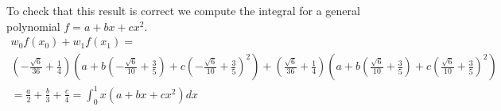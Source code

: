 \begin{solution}
  \newpage
  To check that this result is correct we compute the integral for a
  general polynomial $f = a + bx + cx^2$.
  \begin{align*}
    w_0 f(x_0) + w_1 f(x_1)  = \\
    \left(- \frac{\sqrt{6}}{36} + \frac{1}{4}\right) \left(a + b 
                                    \left(- \frac{\sqrt{6}}{10} +
                                    \frac{3}{5}\right) + c \left(-
                                    \frac{\sqrt{6}}{10} +
                                    \frac{3}{5}\right)^{2}\right) +
                                    \left(\frac{\sqrt{6}}{36} +
                                    \frac{1}{4}\right) \left(a + b
                                    \left(\frac{\sqrt{6}}{10} +
                                    \frac{3}{5}\right) + c
                                    \left(\frac{\sqrt{6}}{10} +
                                    \frac{3}{5}\right)^{2}\right) \\
     = \frac{a}{2} + \frac{b}{3} + \frac{c}{4} = \int_0^1 x (a + bx + cx^2) dx \\
  \end{align*}
\end{solution}


